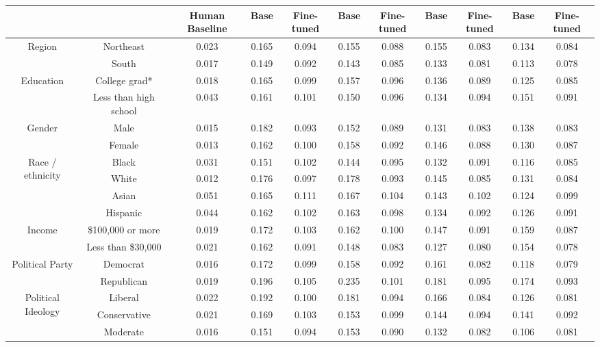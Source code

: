 \begin{table*}[ht]
\begin{tabular}{cc|c|cc|cc|cc|cc}
    & & Human Baseline & Base & Fine-tuned & Base & Fine-tuned & Base & Fine-tuned & Base & Fine-tuned \\
    \midrule
    \multirow{2}{*}{Region} &
    Northeast & 0.023 & 0.165 & 0.094 & 0.155 & 0.088 & 0.155 & 0.083 & 0.134 & 0.084 \\
    & South & 0.017 & 0.149 & 0.092 & 0.143 & 0.085 & 0.133 & 0.081 & 0.113 & 0.078 \\
    \midrule
    \multirow{2}{*}{Education} &
    College grad* & 0.018 & 0.165 & 0.099 & 0.157 & 0.096 & 0.136 & 0.089 & 0.125 & 0.085 \\
    & Less than high school & 0.043 & 0.161 & 0.101 & 0.150 & 0.096 & 0.134 & 0.094 & 0.151 & 0.091 \\
    \midrule
    \multirow{2}{*}{Gender} &
    Male & 0.015 & 0.182 & 0.093 & 0.152 & 0.089 & 0.131 & 0.083 & 0.138 & 0.083 \\
    & Female & 0.013 & 0.162 & 0.100 & 0.158 & 0.092 & 0.146 & 0.088 & 0.130 & 0.087 \\
    \midrule
    \multirow{4}{*}{Race / ethnicity} &
    Black & 0.031 & 0.151 & 0.102 & 0.144 & 0.095 & 0.132 & 0.091 & 0.116 & 0.085 \\
    & White & 0.012 & 0.176 & 0.097 & 0.178 & 0.093 & 0.145 & 0.085 & 0.131 & 0.084 \\
    & Asian & 0.051 & 0.165 & 0.111 & 0.167 & 0.104 & 0.143 & 0.102 & 0.124 & 0.099 \\
    & Hispanic & 0.044 & 0.162 & 0.102 & 0.163 & 0.098 & 0.134 & 0.092 & 0.126 & 0.091 \\
    \midrule
    \multirow{2}{*}{Income} &
    \$100,000 or more & 0.019 & 0.172 & 0.103 & 0.162 & 0.100 & 0.147 & 0.091 & 0.159 & 0.087 \\
    & Less than \$30,000 & 0.021 & 0.162 & 0.091 & 0.148 & 0.083 & 0.127 & 0.080 & 0.154 & 0.078 \\
    \midrule
    \multirow{2}{*}{Political Party} &
    Democrat & 0.016 & 0.172 & 0.099 & 0.158 & 0.092 & 0.161 & 0.082 & 0.118 & 0.079 \\
    & Republican & 0.019 & 0.196 & 0.105 & 0.235 & 0.101 & 0.181 & 0.095 & 0.174 & 0.093 \\
    \midrule
    \multirow{3}{*}{Political Ideology} &
    Liberal & 0.022 & 0.192 & 0.100 & 0.181 & 0.094 & 0.166 & 0.084 & 0.126 & 0.081 \\
    & Conservative & 0.021 & 0.169 & 0.103 & 0.153 & 0.099 & 0.144 & 0.094 & 0.141 & 0.092 \\
    & Moderate & 0.016 & 0.151 & 0.094 & 0.153 & 0.090 & 0.132 & 0.082 & 0.106 & 0.081 \\

\end{tabular}
\end{table*}
